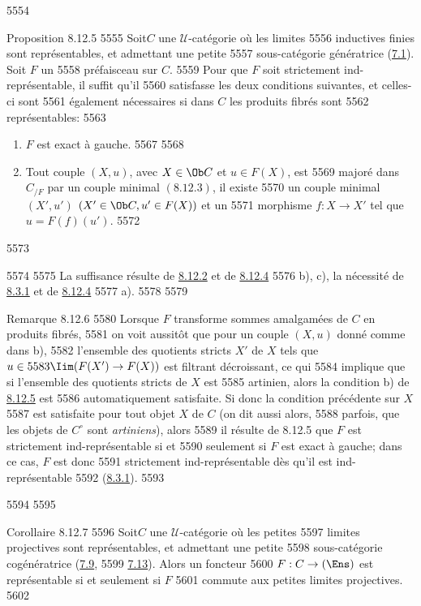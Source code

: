   5554	\begin{enonce*}{Proposition 8.12.5}
  5555	Soit\pageoriginale $C$ une $𝒰$-catégorie où les limites
  5556	inductives finies sont représentables, et admettant une petite
  5557	sous-catégorie génératrice (\hyperref[I.def7.1]{7.1}). Soit $F$ un
  5558	préfaisceau sur $C$.
  5559	Pour que $F$ soit strictement ind-représentable, il suffit qu'il
  5560	satisfasse les deux conditions suivantes, et celles-ci sont
  5561	également nécessaires si dans $C$ les produits fibrés sont
  5562	représentables:
  5563	\begin{enumerate}
  5564	\renewcommand{\theenumi}{\alph{enumi}}
  5565	\renewcommand{\labelenumi}{\theenumi)}
  5566	\item $F$ est exact à gauche.
  5567	
  5568	\item Tout couple $(X,u)$, avec $X\in \Ob C$ et $u\in F(X)$, est
  5569	majoré dans $C_{/F}$ par un couple minimal $(8.12.3)$, \ie il existe
  5570	un couple minimal $(X',u')$ $(X'\in \Ob C, u'\in F(X))$ et un
  5571	morphisme $f:X\rightarrow X'$ tel que $u=F(f)(u')$.
  5572	\end{enumerate}
  5573	\end{enonce*}
  5574	
  5575	La suffisance résulte de \hyperref[I.prop8.12.2]{8.12.2} et de \hyperref[I.lem8.12.4]{8.12.4}
  5576	b), c), la nécessité de \hyperref[I.prop8.3.1]{8.3.1} et de \hyperref[I.lem8.12.4]{8.12.4}
  5577	a).
  5578	
  5579	\begin{enonce*}[remark]{Remarque 8.12.6}
  5580	Lorsque $F$ transforme sommes amalgamées de $C$ en produits fibrés,
  5581	on voit aussitôt que pour un couple $(X,u)$ donné comme dans b),
  5582	l'ensemble des quotients stricts $X'$ de $X$ tels que $u\in
  5583	\Iim(F(X')\rightarrow F(X))$ est filtrant décroissant, ce qui
  5584	implique que si l'ensemble des quotients stricts de $X$ est
  5585	artinien, alors la condition b) de \hyperref[I.prop8.12.5]{8.12.5} est
  5586	automatiquement satisfaite. Si donc la condition précédente sur $X$
  5587	est satisfaite pour tout objet $X$ de $C$ (on dit aussi alors,
  5588	parfois, que les objets de $C^\circ$ sont \emph{artiniens}), alors
  5589	il résulte de 8.12.5 que $F$ est strictement ind-représentable si et
  5590	seulement si $F$ est exact à gauche; dans ce cas, $F$ est donc
  5591	strictement ind-représentable dès qu'il est ind-représentable
  5592	(\hyperref[I.prop8.3.1]{8.3.1}).
  5593	\end{enonce*}
  5594	
  5595	\begin{enonce*}{Corollaire 8.12.7}
  5596	Soit\pageoriginale $C$ une $𝒰$-catégorie où les petites
  5597	limites projectives sont représentables, et admettant une petite
  5598	sous-catégorie cogénératrice (\hyperref[I.sec7.9]{7.9},
  5599	\hyperref[I.exem7.13]{7.13}). Alors un foncteur
  5600	$F:C\rightarrow (\Ens)$ est représentable si et seulement si $F$
  5601	commute aux petites limites projectives.
  5602	\end{enonce*}
